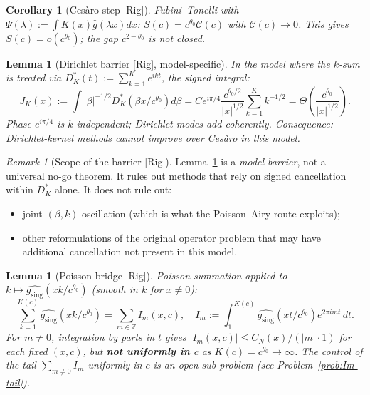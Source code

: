 \documentclass[12pt,a4paper]{amsart}
\newtheorem{lemma}[theorem]{Lemma}
\newtheorem{corollary}[theorem]{Corollary}
\theoremstyle{definition}
\theoremstyle{remark}
\newtheorem{remark}[theorem]{Remark}
\newcommand{\gsing}{g_{\mathrm{sing}}}
\newcommand{\Rig}{\textup{[Rig]}}
\begin{document}
\begin{corollary}[Ces\`aro step \Rig]
\label{cor:cesaro-closed}
Fubini--Tonelli with
$\Psi(\lambda):=\int K(x)
\widehat{g}(\lambda x)dx$:
$S(c)=c^{\theta_0}\mathcal{C}(c)$
with $\mathcal{C}(c)\to 0$.
This gives $S(c)=o(c^{\theta_0})$;
the gap $c^{2-\theta_0}$ is
\emph{not} closed.
\end{corollary}

\begin{lemma}[Dirichlet barrier \Rig,
  model-specific]
\label{lem:dirichlet-obstruction}
In the model where the
$k$-sum is treated via
$D^*_K(t):=\sum_{k=1}^K e^{ikt}$,
the signed integral:
\begin{equation}\label{eq:JK}
  J_K(x):=\int|\beta|^{-1/2}
  D^*_K(\beta x/c^{\theta_0})d\beta
  = Ce^{i\pi/4}
  \frac{c^{\theta_0/2}}{|x|^{1/2}}
  \sum_{k=1}^K k^{-1/2}
  = \Theta\!\left(
  \frac{c^{\theta_0}}{|x|^{1/2}}\right).
\end{equation}
Phase $e^{i\pi/4}$
is $k$-independent;
Dirichlet modes add coherently.
Consequence: Dirichlet-kernel
methods cannot improve over
Ces\`aro \emph{in this model}.
\end{lemma}

\begin{remark}[Scope of the
  barrier \Rig]
\label{rem:barrier-scope}
Lemma~\ref{lem:dirichlet-obstruction}
is a \emph{model barrier},
not a universal no-go theorem.
It rules out methods that
rely on signed cancellation
within $D^*_K$ alone.
It does not rule out:
\begin{itemize}[nosep]
\item joint $(\beta,k)$ oscillation
  (which is what the
  Poisson--Airy route exploits);
\item other reformulations of
  the original operator problem
  that may have additional
  cancellation not present
  in this model.
\end{itemize}
\end{remark}

\begin{lemma}[Poisson bridge \Rig]
\label{lem:poisson-bridge}
Poisson summation
applied to
$k\mapsto\widehat{\gsing}(xk/c^{\theta_0})$
(smooth in $k$ for $x\ne 0$):
\begin{equation}\label{eq:poisson}
  \sum_{k=1}^{K(c)}
  \widehat{\gsing}(xk/c^{\theta_0})
  = \sum_{m\in\mathbb{Z}} I_m(x,c),
  \quad
  I_m:=\int_1^{K(c)}
  \widehat{\gsing}(xt/c^{\theta_0})
  e^{2\pi imt}\,dt.
\end{equation}
For $m\ne 0$, integration by
parts in $t$ gives
$|I_m(x,c)|
\le C_N(x)/(|m|\cdot 1)$
\emph{for each fixed $(x,c)$},
but \textbf{not uniformly in $c$}
as $K(c)=c^{\theta_0}\to\infty$.
The control of the tail
$\sum_{m\ne 0}I_m$
uniformly in $c$ is an open
sub-problem (see
Problem~\ref{prob:Im-tail}).
\end{lemma}
\end{document}
